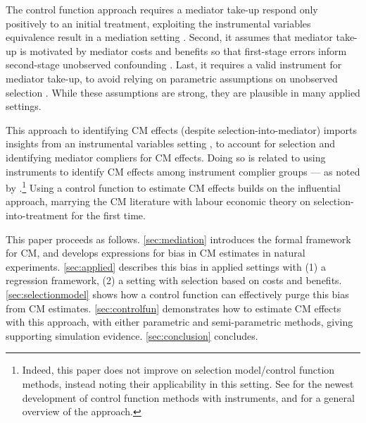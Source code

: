 The control function approach requires a mediator take-up respond only positively to an initial treatment, exploiting the instrumental variables equivalence result in a mediation setting \citep{vytlacil2002independence}.
Second, it assumes that mediator take-up is motivated by mediator costs and benefits so that first-stage errors inform second-stage unobserved confounding \citep{florens2008identification}.
Last, it requires a valid instrument for mediator take-up, to avoid relying on parametric assumptions on unobserved selection \citep{heckman2004using}.
While these assumptions are strong, they are plausible in many applied settings.

This approach to identifying CM effects (despite selection-into-mediator) imports insights from an instrumental variables setting \citep{kline2019heckits}, to account for selection and identifying mediator compliers for CM effects.
Doing so is related to using instruments to identify CM effects among instrument complier groups --- as noted by \cite{frolich2017direct}.\footnote{
    Indeed, this paper does not improve on selection model/control function methods, instead noting their applicability in this setting.
    See \cite{frolich2017direct} for the newest development of control function methods with instruments, and \cite{imbens2007nonadditive} for a general overview of the approach.
}
Using a control function to estimate CM effects builds on the influential \cite{imai2010identification} approach, marrying the CM literature with labour economic theory on selection-into-treatment for the first time. 

This paper proceeds as follows.
\autoref{sec:mediation} introduces the formal framework for CM, and develops expressions for bias in CM estimates in natural experiments.
\autoref{sec:applied} describes this bias in applied settings with (1) a regression framework, (2) a setting with selection based on costs and benefits.
\autoref{sec:selectionmodel} shows how a control function can effectively purge this bias from CM estimates.
\autoref{sec:controlfun} demonstrates how to estimate CM effects with this approach, with either parametric and semi-parametric methods, giving supporting simulation evidence.
\autoref{sec:conclusion} concludes.
